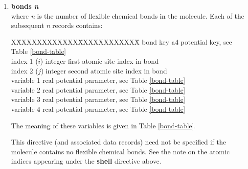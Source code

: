 \begin{enumerate}
\item{\bf bonds {\em n}} \\
where {\em n} is the number of flexible chemical bonds in the
molecule.  Each of the subsequent {\em n} records contains:
\begin{tabbing}
X\=XXXXXXXXXXXX\=XXXXXXXXXXXX\=\kill
\> bond key      \> a4      \> potential key, see Table \ref{bond-table} \\
\> index 1 ($i$) \> integer \> first atomic site index in bond \\
\> index 2 ($j$) \> integer \> second atomic site index in bond \\
\> variable 1    \> real    \> potential parameter, see Table \ref{bond-table} \\
\> variable 2    \> real    \> potential parameter, see Table \ref{bond-table} \\
\> variable 3    \> real    \> potential parameter, see Table \ref{bond-table} \\
\> variable 4    \> real    \> potential parameter, see Table \ref{bond-table}
\end{tabbing}
The meaning of these variables is given in Table \ref{bond-table}.

This directive (and associated data records) need not be specified
if the molecule contains no flexible chemical bonds.  See the note
on the atomic indices appearing under the {\bf shell} directive
above.


\end{enumerate}
